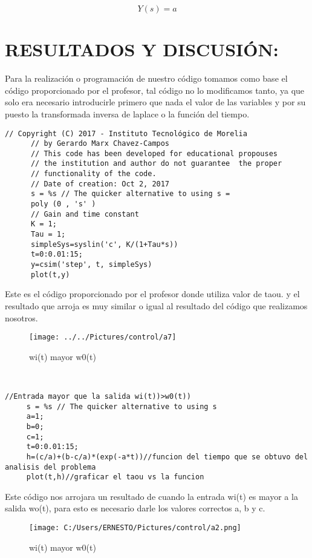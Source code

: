 \documentclass{article}
\begin{document}
\begin{equation}
Y(s)=a
\end{equation}

\section{RESULTADOS Y DISCUSIÓN:}
Para la realización o programación de nuestro código tomamos como base el código proporcionado por el profesor, tal código no lo modificamos tanto, ya que solo era necesario introducirle primero que nada el valor de las variables y por su puesto la transformada inversa de laplace o la función del tiempo. 
\begin{lstlisting}[frame=single]
      // Copyright (C) 2017 - Instituto Tecnológico de Morelia 
      // by Gerardo Marx Chavez-Campos
      // This code has been developed for educational propouses
      // the institution and author do not guarantee  the proper
      // functionality of the code.
      // Date of creation: Oct 2, 2017
      s = %s // The quicker alternative to using s =
      poly (0 , 's' ) 
      // Gain and time constant
      K = 1;  
      Tau = 1; 
      simpleSys=syslin('c', K/(1+Tau*s))
      t=0:0.01:15;
      y=csim('step', t, simpleSys)
      plot(t,y)

\end{lstlisting}
Este es el código proporcionado por el profesor donde utiliza valor de taou. y el resultado que arroja es muy similar o igual al resultado del código que realizamos nosotros.\\
\begin{figure}[h!]
	\centering
\texttt{[image: ../../Pictures/control/a7]}
	\caption{wi(t) mayor w0(t)}
\end{figure}\\
\begin{lstlisting}[frame=single]
     //Entrada mayor que la salida wi(t))>w0(t))
     s = %s // The quicker alternative to using s
     a=1;  
     b=0;
     c=1;
     t=0:0.01:15;
     h=(c/a)+(b-c/a)*(exp(-a*t))//funcion del tiempo que se obtuvo del analisis del problema
     plot(t,h)//graficar el taou vs la funcion
\end{lstlisting}
Este código nos arrojara un resultado de cuando la entrada wi(t) es mayor a la salida wo(t), para esto es necesario darle los valores correctos a, b y c.\\
\begin{figure}[h!]
		\centering
\texttt{[image: C:/Users/ERNESTO/Pictures/control/a2.png]}
		\caption{wi(t) mayor w0(t)}
			\label{fig:C:/Users/ERNESTO/Pictures/control/a2.png}
	\end{figure}\\
\end{document}
